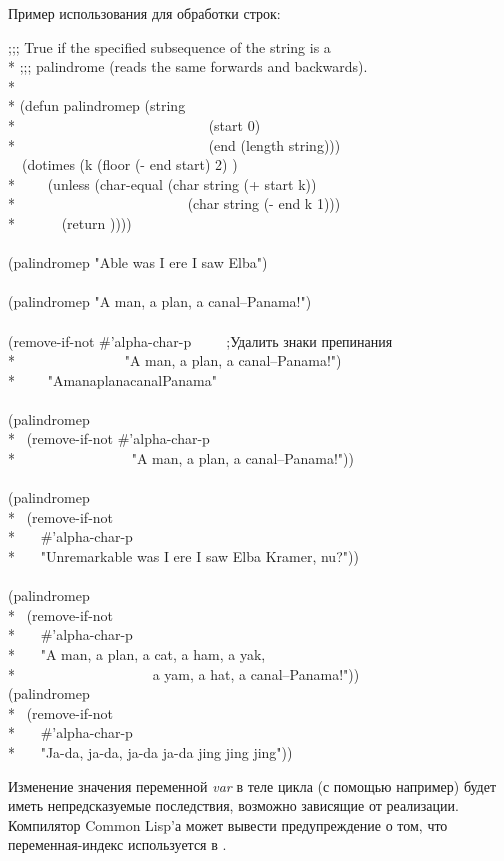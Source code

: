 \begin{defmac}
Пример использования  для обработки строк:
\begin{lisp}
;;; True if the specified subsequence of the string is a \\*
;;; palindrome (reads the same forwards and backwards). \\*
\\*
(defun palindromep (string  \\*
~~~~~~~~~~~~~~~~~~~~~~~~~~~(start 0) \\*
~~~~~~~~~~~~~~~~~~~~~~~~~~~(end (length string))) \\
~~(dotimes (k (floor (- end start) 2) {\true}) \\*
~~~~(unless (char-equal (char string (+ start k)) \\*
~~~~~~~~~~~~~~~~~~~~~~~~(char string (- end k 1))) \\*
~~~~~~(return {\false})))) \\
\\
(palindromep "Able was I ere I saw Elba") \EV\ {\true} \\
 \\
(palindromep "A man, a plan, a canal--Panama!") \EV\ {\false} \\
 \\
(remove-if-not \#'alpha-char-p~~~~~;\textrm{Удалить знаки препинания} \\*
~~~~~~~~~~~~~~~"A man, a plan, a canal--Panama!") \\*
~~~\EV\ "AmanaplanacanalPanama" \\
 \\
(palindromep \\*
~(remove-if-not \#'alpha-char-p \\*
~~~~~~~~~~~~~~~~"A man, a plan, a canal--Panama!")) \EV\ {\true} \\
 \\
(palindromep \\*
~(remove-if-not \\*
~~~\#'alpha-char-p \\*
~~~"Unremarkable was I ere I saw Elba Kramer, nu?")) \EV\ {\true} \\
 \\
(palindromep \\*
~(remove-if-not \\*
~~~\#'alpha-char-p \\*
~~~"A man, a plan, a cat, a ham, a yak, \\*
~~~~~~~~~~~~~~~~~~~a yam, a hat, a canal--Panama!")) \EV\ {\true}
\\
(palindromep \\*
~(remove-if-not \\*
~~~\#'alpha-char-p \\*
~~~"Ja-da, ja-da, ja-da ja-da jing jing jing")) \EV\ {\false}
\end{lisp}

Изменение значения переменной \emph{var} в теле цикла (с помощью 
например) будет иметь непредсказуемые последствия, возможно зависящие от
реализации. Компилятор Common Lisp'а может вывести предупреждение о том, что
переменная-индекс используется в .
\end{defmac}

